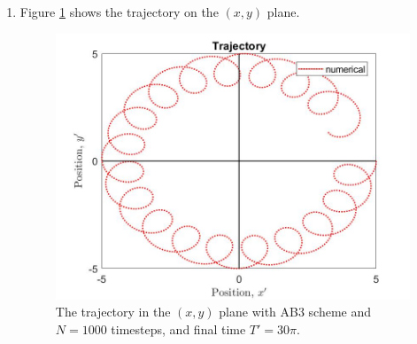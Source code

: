 \documentclass{article}
\begin{document}
\begin{enumerate}
\begin{enumerate}
\item
Figure \ref{problem 2.1} shows the trajectory on the $(x, y)$ plane. 
\begin{figure}[h]
\centering
\vbox{
\includegraphics[scale=0.4]{problem2/trajectory.jpg}
}
\caption{The trajectory in the $(x, y)$ plane with AB3 scheme and $N=1000$ timesteps, and final time $T' = 30\pi$.}
\label{problem 2.1}
\end{figure}


\end{enumerate}
\end{enumerate}
\end{document}
